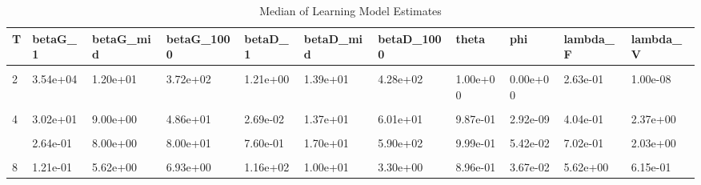 \begin{table}[!h]
\centering
\caption{Median of Learning Model Estimates}
\centering
\begin{tabular}[t]{lllllllllll}
\toprule
T & betaG\_1 & betaG\_mid & betaG\_1000 & betaD\_1 & betaD\_mid & betaD\_1000 & theta & phi & lambda\_F & lambda\_V\\
\midrule
\cellcolor{gray!10}{1} & \cellcolor{gray!10}{3.81e-04} & \cellcolor{gray!10}{1.60e+01} & \cellcolor{gray!10}{2.25e+02} & \cellcolor{gray!10}{7.19e-09} & \cellcolor{gray!10}{3.95e+01} & \cellcolor{gray!10}{6.60e+02} & \cellcolor{gray!10}{1.00e+00} & \cellcolor{gray!10}{8.88e-01} & \cellcolor{gray!10}{1.77e+01} & \cellcolor{gray!10}{6.18e+05}\\
2 & 3.54e+04 & 1.20e+01 & 3.72e+02 & 1.21e+00 & 1.39e+01 & 4.28e+02 & 1.00e+00 & 0.00e+00 & 2.63e-01 & 1.00e-08\\
\cellcolor{gray!10}{3} & \cellcolor{gray!10}{2.52e-02} & \cellcolor{gray!10}{9.00e+00} & \cellcolor{gray!10}{9.93e+01} & \cellcolor{gray!10}{2.11e-02} & \cellcolor{gray!10}{4.00e+01} & \cellcolor{gray!10}{7.20e+02} & \cellcolor{gray!10}{1.00e+00} & \cellcolor{gray!10}{7.72e-01} & \cellcolor{gray!10}{4.27e+00} & \cellcolor{gray!10}{4.69e+04}\\
4 & 3.02e+01 & 9.00e+00 & 4.86e+01 & 2.69e-02 & 1.37e+01 & 6.01e+01 & 9.87e-01 & 2.92e-09 & 4.04e-01 & 2.37e+00\\
\cellcolor{gray!10}{5} & \cellcolor{gray!10}{3.59e+00} & \cellcolor{gray!10}{7.00e+00} & \cellcolor{gray!10}{8.32e+00} & \cellcolor{gray!10}{1.44e-01} & \cellcolor{gray!10}{1.41e+01} & \cellcolor{gray!10}{4.08e+01} & \cellcolor{gray!10}{9.77e-01} & \cellcolor{gray!10}{3.05e-09} & \cellcolor{gray!10}{8.87e-01} & \cellcolor{gray!10}{4.73e-01}\\
\addlinespace
6 & 2.64e-01 & 8.00e+00 & 8.00e+01 & 7.60e-01 & 1.70e+01 & 5.90e+02 & 9.99e-01 & 5.42e-02 & 7.02e-01 & 2.03e+00\\
\cellcolor{gray!10}{7} & \cellcolor{gray!10}{1.40e+00} & \cellcolor{gray!10}{2.77e+00} & \cellcolor{gray!10}{3.52e+00} & \cellcolor{gray!10}{8.45e+01} & \cellcolor{gray!10}{1.10e+01} & \cellcolor{gray!10}{1.69e+00} & \cellcolor{gray!10}{7.72e-01} & \cellcolor{gray!10}{3.56e-03} & \cellcolor{gray!10}{4.52e+00} & \cellcolor{gray!10}{1.68e-02}\\
8 & 1.21e-01 & 5.62e+00 & 6.93e+00 & 1.16e+02 & 1.00e+01 & 3.30e+00 & 8.96e-01 & 3.67e-02 & 5.62e+00 & 6.15e-01\\
\bottomrule
\end{tabular}
\end{table}
